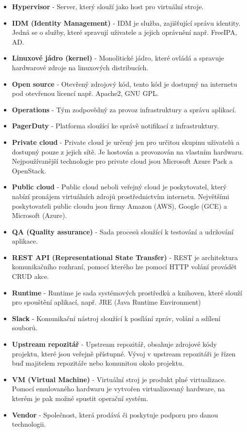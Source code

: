 \begin{itemize}
\item \textbf{Hypervisor} - Server, který slouží jako host pro virtuální stroje.
\item \textbf{IDM (Identity Management)} - IDM je služba, zajišťující správu identity. Jedná se o služby, které spravují uživatele a jejich oprávnění např. FreeIPA, AD.
\item \textbf{Linuxové jádro (kernel)} - Monolitické jádro, které ovládá a spravuje hardwarové zdroje na linuxových distribucích.  
\item \textbf{Open source} - Otevřený zdrojový kód, tento kód je dostupný na internetu pod otevřenou licencí např. Apache2, GNU GPL. 
\item \textbf{Operations} - Tým zodpovědný za provoz infrastruktury a správu aplikací.
\item \textbf{PagerDuty} - Platforma sloužící ke správě notifikací z infrastruktury.
\item \textbf{Private cloud} - Private cloud je určený jen pro určitou skupinu uživatelů a dostupný pouze z jejich sítě. Je hostován a provozován na vlastním hardwaru. Nejpoužívanější technologie pro private cloud jsou Microsoft Azure Pack a OpenStack.
\item \textbf{Public cloud} - Public cloud neboli veřejný cloud je poskytovatel, který nabízí pronájem virtuálních zdrojů prostřednictvím internetu. Největšími poskytovateli public cloudu jsou firmy Amazon (AWS), Google (GCE) a Microsoft (Azure).
\item \textbf{QA (Quality assurance)} - Sada procesů sloužící k testování a udržování aplikace.
\item \textbf{REST API (Representational State Transfer)} - REST je architektura komunikačního rozhraní, pomocí kterého lze pomocí HTTP volání provádět CRUD akce. 
\item \textbf{Runtime} - Runtime je sada systémových prostředků a knihoven, které slouží pro spouštění aplikací, např. JRE (Java Runtime Environment)
\item \textbf{Slack} - Komunikační nástroj sloužící k posílání zpráv, volání a sdílení souborů.
\item \textbf{Upstream repozitář} - Upstream repozitář, obsahuje zdrojové kódy projektu, které jsou veřejně přístupné. Vývoj v upstream repozitáři je řízen buď majitelem repozitáře nebo komunitou okolo projektu.
\item \textbf{VM (Virtual Machine)} - Virtuální stroj je produkt plné virtualizace. Pomocí emulovaného hardwaru je vytvořen virtualizovaný hardware, na kterém je pak možné spustit operační systém. 
\item \textbf{Vendor} - Společnost, která prodává či poskytuje podporu pro danou technologii.
\end{itemize}